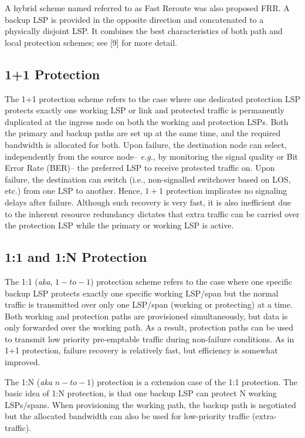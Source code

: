 A hybrid scheme named referred to as Fast Reroute was also proposed
FRR. A backup LSP is provided in the opposite direction and concatenated
to a physically disjoint LSP. It combines the best characteristics
of both path and local protection schemes; see {[}9] for more detail.


\subsection{1+1 Protection}

The 1+1 protection scheme refers to the case where one dedicated protection
LSP protects exactly one working LSP or link and protected traffic
is permanently duplicated at the ingress node on both the working
and protection LSPs. Both the primary and backup paths are set up
at the same time, and the required bandwidth is allocated for both.
Upon failure, the destination node can select, independently from
the source node-- \emph{e.g.}, by monitoring the signal quality or
Bit Error Rate (BER)-- the preferred LSP to receive protected traffic
on. Upon failure, the destination can switch (i.e., non-signalled
switchover based on LOS, etc.) from one LSP to another. Hence, $1+1$
protection implicates no signaling delays after failure. Although
such recovery is very fast, it is also inefficient due to the inherent
resource redundancy dictates that extra traffic can be carried over
the protection LSP while the primary or working LSP is active.


\subsection{1:1 and 1:N Protection}

The 1:1 (\emph{aka}, $1-to-1$) protection scheme refers to the case
where one specific backup LSP protects exactly one specific working
LSP/span but the normal traffic is transmitted over only one LSP/span
(working or protecting) at a time. Both working and protection paths
are provisioned simultaneously, but data is only forwarded over the
working path. As a result, protection paths can be used to transmit
low priority pre-emptable traffic during non-failure conditions. As
in 1+1 protection, failure recovery is relatively fast, but efficiency
is somewhat improved.

The 1:N (\emph{aka} $n-to-1$) protection is a extension case of the
1:1 protection. The basic idea of 1:N protection, is that one backup
LSP can protect N working LSPs/spans. When provisioning the working
path, the backup path is negotiated but the allocated bandwidth can
also be used for low-priority traffic (extra-traffic).


